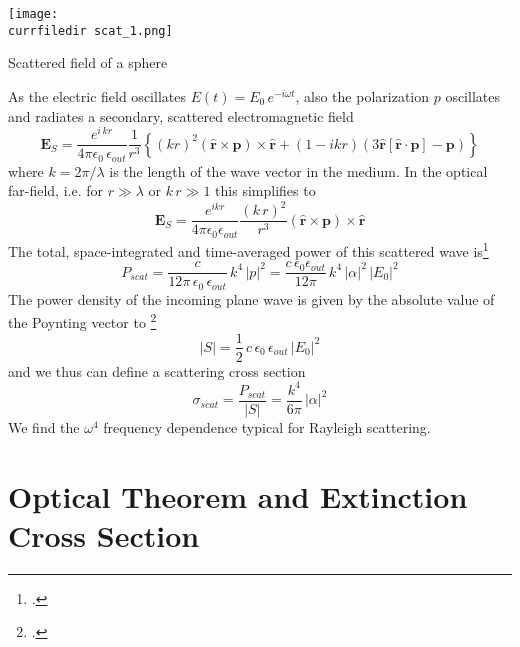 \begin{marginfigure}
   \texttt{[image: \\currfiledir scat\_1.png]}
  \caption{Scattered field of  a sphere}
\end{marginfigure}


As the electric field oscillates $E(t) = E_0 \, e^{-i \omega t}$, also the polarization $p$ oscillates and radiates a secondary, scattered electromagnetic field 
\begin{equation}
  \mathbf{E}_S = \frac{ e^{i \, k  r} }{4\pi\epsilon_0 \, \epsilon_{out}}  \frac{1}{r^3}\left\{
      (k r )^2 \left( \hat{\mathbf{r}} \times \mathbf{p} \right) \times \hat{\mathbf{r}} +
      \left( 1 -  i k r \right)
        \left( 3\hat{\mathbf{r}} \left[\hat{\mathbf{r}} \cdot \mathbf{p}\right] - \mathbf{p} \right)
    \right\}
\end{equation}
where $k = 2 \pi / \lambda$ is the length of the wave vector in the medium. In the optical far-field, i.e. for $r \gg \lambda$ or $k \, r \gg 1$ this simplifies to 
\begin{equation}
  \mathbf{E}_S = \frac{e^{ikr}}{4\pi\epsilon_0 \epsilon_{out} } 
      \frac{( k \, r)^2}{ r^3} \left( \hat{\mathbf{r}} \times \mathbf{p} \right) \times \hat{\mathbf{r}} 
\end{equation}
The total, space-integrated and time-averaged power of this scattered wave is\footcite[chapter 4.5.2]{Nolting-ED}
\begin{equation}
P_{scat} =\frac{c  }{12 \pi  \, \epsilon_0 \, \epsilon_{out} } \, k^4 \, |p|^2 =
\frac{c \, \epsilon_0 \epsilon_{out} }{12 \pi  } \, k^4 \, |\alpha|^2 \, |E_0|^2
\end{equation}
The power density of the incoming plane wave is given by the absolute value of the Poynting vector to \footcite[chapter 4.3.8]{Nolting-ED}
\begin{equation}
 |S| = \frac{1}{2} \, c \, \epsilon_0 \, \epsilon_{out} \, |E_0|^2
\end{equation}
and we thus can define a scattering cross section
\begin{equation}
\sigma_{scat} = \frac{P_{scat}}{|S|} = \frac{k^4}{6 \pi }  \, |\alpha|^2 
\end{equation}
We find the $\omega^4$ frequency dependence typical for Rayleigh scattering.



\section{Optical Theorem and Extinction Cross Section}

